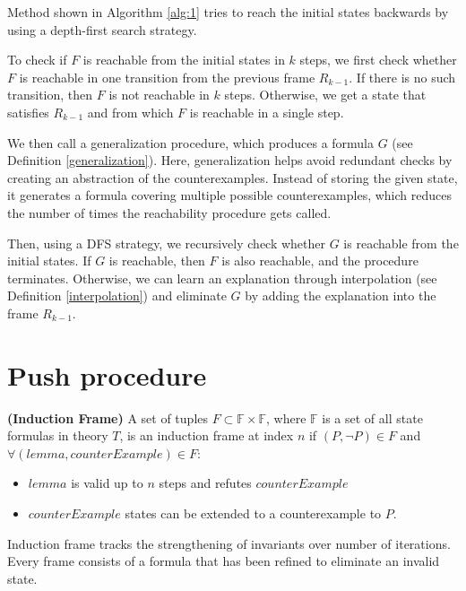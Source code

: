 \vspace{\baselineskip}
\noindent Method shown in Algorithm \ref{alg:1} tries to reach the initial states backwards by using a depth-first search strategy.

To check if \( F \) is reachable from the initial states in \( k \) steps, we
first check whether \( F \) is reachable in one transition from the previous
frame \( R_{k-1} \). If there is no such transition, then \( F \) is not
reachable in \( k \) steps. Otherwise, we get a state that satisfies \( R_{k-1}
\) and from which \( F \) is reachable in a single step. 

We then call a
generalization procedure, which produces a formula \( G \) (see Definition
\ref{generalization}). Here, generalization helps avoid redundant checks by creating an abstraction of the counterexamples. Instead of storing the given state, it generates a formula covering multiple possible counterexamples, which reduces the number of times the reachability procedure gets called.

Then, using a DFS strategy, we recursively
check whether \( G \) is reachable from the initial states.
If \( G \) is reachable, then \( F \) is also reachable, and the procedure terminates. Otherwise,
we can learn an explanation through interpolation (see Definition
\ref{interpolation}) and eliminate \( G \) by adding the
explanation into the frame \( R_{k-1} \).


\section{Push procedure} \label{Push}

\begin{definition}{\textbf{(Induction Frame)}}
    \cite{7886665}\label{def:IFrame} A set of tuples $F \subset \mathbb{F} \times \mathbb{F}$, where $\mathbb{F}$ is a set of all state formulas in theory $T$, is an induction frame at index $n$ if $(P, \neg P) \in F$ and $\forall (lemma, counterExample) \in F$:
    \begin{itemize}
        \item $lemma$ is valid up to $n$ steps and refutes $counterExample$
        \item $counterExample$ states can be extended to a counterexample to $P$.
    \end{itemize}
\end{definition}

\vspace{\baselineskip}
\noindent Induction frame tracks the strengthening of invariants over number of iterations. Every frame consists of a formula that has been refined to eliminate an invalid state.

